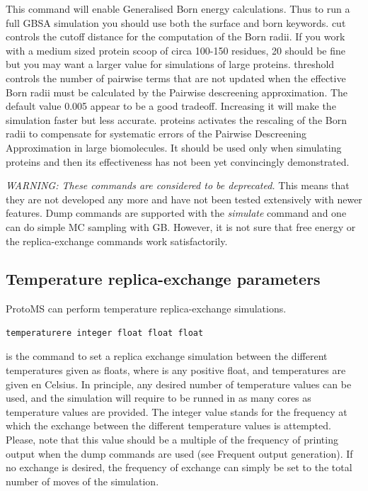 \documentclass[letterpaper,10pt,english]{manual}
\begin{document}
This command will enable Generalised Born energy calculations. Thus to run a full GBSA simulation you should use both the surface and born keywords. cut controls the cutoff distance for the computation of the Born radii. If you work with a medium sized protein scoop of circa 100-150 residues, 20 should be fine but you may want a larger value for simulations of large proteins. threshold controls the number of pairwise terms that are not updated when the effective Born radii must be calculated by the Pairwise descreening approximation. The default value
0.005 appear to be a good tradeoff. Increasing it will make the simulation faster but less accurate. proteins activates the rescaling of the Born radii to compensate for systematic errors of the Pairwise Descreening Approximation in large biomolecules. It should be used only when simulating proteins and then its effectiveness has not been yet
convincingly demonstrated.

\emph{WARNING: These commands are considered to be deprecated.} This means that they are not developed any more and have not been tested extensively with newer features. Dump commands are supported with the \emph{simulate} command and one can do simple MC sampling with GB. However, it is not sure that free energy or the replica-exchange commands work satisfactorily.


\subsection{Temperature replica-exchange parameters}

ProtoMS can perform temperature replica-exchange simulations.
\begin{Verbatim}[commandchars=@\[\]]
temperaturere integer float float float
\end{Verbatim}

is the command to set a replica exchange simulation between the different temperatures given as floats, where  is any positive float, and temperatures are given en Celsius. In principle, any desired number of temperature values can be used, and the simulation will require to be runned in as many cores as temperature values are provided. The integer value stands for the frequency at which the exchange between the different temperature values is attempted. Please, note that this value should be a multiple of the frequency of printing output when the dump commands are used (see Frequent output generation). If no exchange is desired, the frequency of exchange can simply be set to the total number of moves of the simulation.
\end{document}

